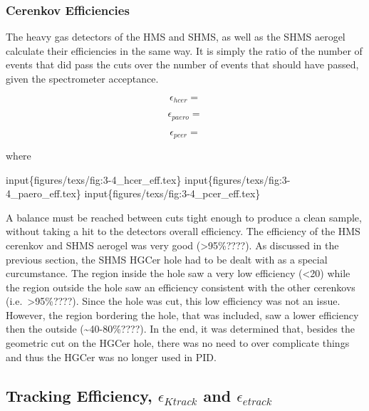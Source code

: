 \documentclass[
]{report}
\begin{document}
\hypertarget{cerenkov-efficiencies}{%
\subsubsection{Cerenkov Efficiencies}\label{cerenkov-efficiencies}}

The heavy gas detectors of the HMS and SHMS, as well as the SHMS aerogel
calculate their efficiencies in the same way. It is simply the ratio of
the number of events that did pass the cuts over the number of events
that should have passed, given the spectrometer acceptance.

\begin{equation} 
  \epsilon_{hcer}=
  \label{eq:hcer_eff} 
\end{equation}

\begin{equation} 
  \epsilon_{paero}=
  \label{eq:paero_eff} 
\end{equation}

\begin{equation} 
  \epsilon_{pcer}=
  \label{eq:pcer_eff} 
\end{equation}

\noindent where

input\{figures/texs/fig:3-4\_hcer\_eff.tex\}
input\{figures/texs/fig:3-4\_paero\_eff.tex\}
input\{figures/texs/fig:3-4\_pcer\_eff.tex\}

A balance must be reached between cuts tight enough to produce a clean
sample, without taking a hit to the detectors overall efficiency. The
efficiency of the HMS cerenkov and SHMS aerogel was very good
(\textgreater95\%????). As discussed in the previous section, the SHMS
HGCer hole had to be dealt with as a special curcumstance. The region
inside the hole saw a very low efficiency (\textless20) while the region
outside the hole saw an efficiency consistent with the other cerenkovs
(i.e.~\textgreater95\%????). Since the hole was cut, this low efficiency
was not an issue. However, the region bordering the hole, that was
included, saw a lower efficiency then the outside
(\textasciitilde40-80\%????). In the end, it was determined that,
besides the geometric cut on the HGCer hole, there was no need to over
complicate things and thus the HGCer was no longer used in PID.

\hypertarget{tracking-efficiency-epsilon_k-track-and-epsilon_e-track}{%
\subsection{\texorpdfstring{Tracking Efficiency, \(\epsilon_{K track}\)
and
\(\epsilon_{e track}\)}{Tracking Efficiency, \textbackslash epsilon\_\{K track\} and \textbackslash epsilon\_\{e track\}}}\label{tracking-efficiency-epsilon_k-track-and-epsilon_e-track}}
\end{document}
